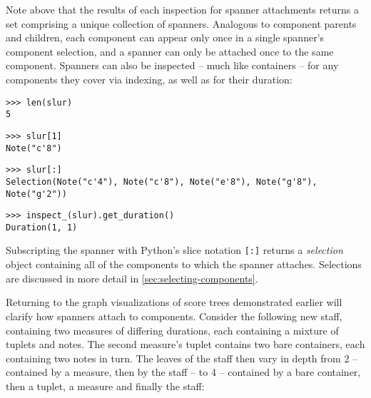 \noindent Note above that the results of each inspection for spanner
attachments returns a set comprising a unique collection of spanners. Analogous
to component parents and children, each component can appear only once in a
single spanner's component selection, and a spanner can only be attached once
to the same component. Spanners can also be inspected -- much like containers
-- for any components they cover via indexing, as well as for their duration:

\begin{comment}
<abjad>
len(slur)
slur[1]
slur[:]
inspect_(slur).get_duration()
</abjad>
\end{comment}

\begin{abjadbookoutput}
\begin{singlespacing}
\vspace{-0.5\baselineskip}
\begin{verbatim}
>>> len(slur)
5
\end{verbatim}
\begin{verbatim}
>>> slur[1]
Note("c'8")
\end{verbatim}
\begin{verbatim}
>>> slur[:]
Selection(Note("c'4"), Note("c'8"), Note("e'8"), Note("g'8"), Note("g'2"))
\end{verbatim}
\begin{verbatim}
>>> inspect_(slur).get_duration()
Duration(1, 1)
\end{verbatim}
\end{singlespacing}
\end{abjadbookoutput}

\noindent Subscripting the spanner with Python's slice notation \texttt{[:]}
returns a \emph{selection} object containing all of the components to which the
spanner attaches. Selections are discussed in more detail in
\autoref{sec:selecting-components}.

Returning to the graph visualizations of score trees demonstrated
earlier will clarify how spanners attach to components. Consider the following
new staff, containing two measures of differing durations, each containing a
mixture of tuplets and notes. The second measure's tuplet contains two bare
containers, each containing two notes in turn. The leaves of the staff then
vary in depth from 2 -- contained by a measure, then by the staff -- to 4 --
contained by a bare container, then a tuplet, a measure and finally the staff:

\begin{comment}
<abjad>
staff = Staff()
measure_one = Measure((3, 4), r"c'4 \times 2/3 { d'4 e'4 f'4 }")
measure_two = Measure((4, 4), r"\times 3/4 { { g'4 a'4 } { b'4 c''4 } } c'4")
staff.extend([measure_one, measure_two])
show(staff)
</abjad>
\end{comment}

